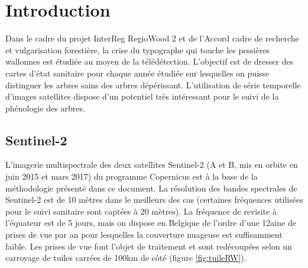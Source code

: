 \documentclass[a4paper, 12pt]{article} %
\begin{document}
\renewcommand{\contentsname}{Table des Matières}
\renewcommand\bibname{Références bibliographiques}


\pagebreak
\tableofcontents
\pagebreak

\section{Introduction}

Dans le cadre du projet InterReg RegioWood 2 et de l'Accord cadre de recherche et vulgarisation forestière, la crise du typographe qui touche les pessières wallonnes est étudiée au moyen de la télédétection. L'objectif est de dresser des cartes d'état sanitaire pour chaque année étudiée sur lesquelles on puisse distinguer les arbres sains des arbres dépérissant. L'utilisation de série temporelle d'images satellites dispose d'un potentiel très intéressant pour le suivi de la phénologie des arbres.


\subsection{Sentinel-2}

L'imagerie multispectrale des deux satellites Sentinel-2 (A et B, mis en orbite en juin 2015 et mars 2017) du programme Copernicus est à la base de la méthodologie présenté dans ce document. La résolution des bandes spectrales de Sentinel-2 est de 10 mètres dans le meilleurs des cas (certaines fréquences utilisées pour le suivi sanitaire sont captées à 20 mètres). La fréquence de revisite à l'équateur est de 5 jours, mais on dispose en Belgique de l'ordre d'une 12aine de prises de vue par an pour lesquelles la couverture nuageuse est suffisamment faible. Les prises de vue font l'objet de traitement et sont redécoupées selon un carroyage de tuiles carrées de 100km de côté (figure \ref{fig:tuileRW}). %
\end{document}
